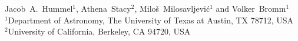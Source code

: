 
Jacob~A.~Hummel$^1$, Athena~Stacy$^2$, \newauthor Milo\v s~Milosavljevi\'c$^1$ and Volker~Bromm$^1$\\
$^1$Department of Astronomy, The University of Texas at Austin, TX 78712, USA\\
$^2$University of California, Berkeley, CA 94720, USA
 

